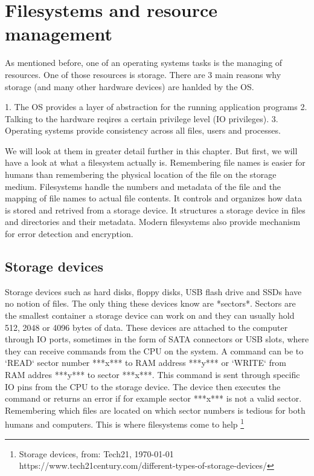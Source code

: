 \section{Filesystems and resource management}

As mentioned before, one of an operating systems tasks is the managing of resources.
One of those resources is storage. There are 3 main reasons why storage (and many other
hardware devices) are hanlded by the OS.

1. The OS provides a layer of abstraction for the running application programs
2. Talking to the hardware reqires a certain privilege level (IO privileges).
3. Operating systems provide consistency across all files, users and processes.

We will look at them in greater detail further in this chapter.
But first, we will have a look at what a filesystem actually is. Remembering file names is easier for
humans than remembering the physical location of the file on the storage medium. Filesystems handle
the numbers and metadata of the file and the mapping of file names to actual file contents. It
controls and organizes how data is stored and retrived from a storage device. It structures a storage
device in files and directories and their metadata. Modern filesystems also provide mechanism for
error detection and encryption.

\subsection{Storage devices}

Storage devices such as hard disks, floppy disks, USB flash drive and SSDs have no notion of files.
The only thing these devices know are *sectors*. Sectors are the smallest container a storage device
can work on and they can usually hold 512, 2048 or 4096 bytes of data. These devices are attached to
the computer through IO ports, sometimes in the form of SATA connectors or USB slots, where they can
receive commands from the CPU on the system. A command can be to `READ` sector number ***x*** to RAM
address ***y*** or `WRITE` from RAM addres ***y*** to sector ***x***. This command is sent through
specific IO pins from the CPU to the storage device. The device then executes the command or returns
an error if for example sector ***x*** is not a valid sector. Remembering which files are located on
which sector numbers is tedious for both humans and computers. This is where filesystems come to help
\footnote{Storage devices, from: Tech21, \today  \\ https://www.tech21century.com/different-types-of-storage-devices/}

